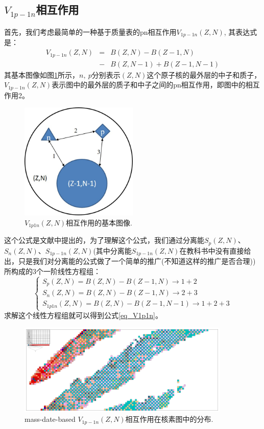\subsection{$V_{1p-1n}$相互作用}
首先，我们考虑最简单的一种基于质量表的pn相互作用$V_{1p-1n}(Z,N)$, 其表达式是：
\begin{eqnarray}
  V_{1p-1n}(Z,N)&=&B(Z,N)-B(Z-1,N)\nonumber\\ 
&-&B(Z,N-1)+B(Z-1,N-1) \label{eq_V1p1n}
\end{eqnarray}
其基本图像如图\ref{picV1p1n}所示，$n,\ p$分别表示$(Z,N)$这个原子核的最外层的中子和质子，$V_{1p-1n}(Z,N)$表示图中的最外层的质子和中子之间的pn相互作用，即图中的相互作用2。
\begin{figure}[H]
\centering
\includegraphics[width=0.5\textwidth]{figure/picV1p1n.jpg}
\caption{$V_{1p1n}(Z,N)$相互作用的基本图像.\label{picV1p1n}}
\end{figure}
这个公式是文献中提出的，为了理解这个公式，我们通过分离能$S_{p}(Z,N)$、$S_{n}(Z,N)$、$S_{1p-1n}(Z,N)$(其中分离能$S_{1p-1n}(Z,N)$在教科书中没有直接给出，只是我们对分离能的公式做了一个简单的推广(不知道这样的推广是否合理))所构成的3个一阶线性方程组：
\begin{displaymath}
\left\{ \begin{array}{l}
S_p(Z,N)=B(Z,N)-B(Z-1,N)\to1+2\\
S_n(Z,N)=B(Z,N)-B(Z-1,N)\to2+3\\
S_{1p1n}(Z,N)=B(Z,N)-B(Z-1,N-1)\to1+2+3
\end{array} \right.
\end{displaymath}
求解这个线性方程组就可以得到公式\ref{eq_V1p1n}。
\begin{figure}[H]
\centering
\includegraphics[width=0.9\textwidth]{figure/oV1p1n.pdf}
\caption{mass-date-based $V_{1p-1n}(Z,N)$相互作用在核素图中的分布.\label{fig_oV1p1n}}
\end{figure}
